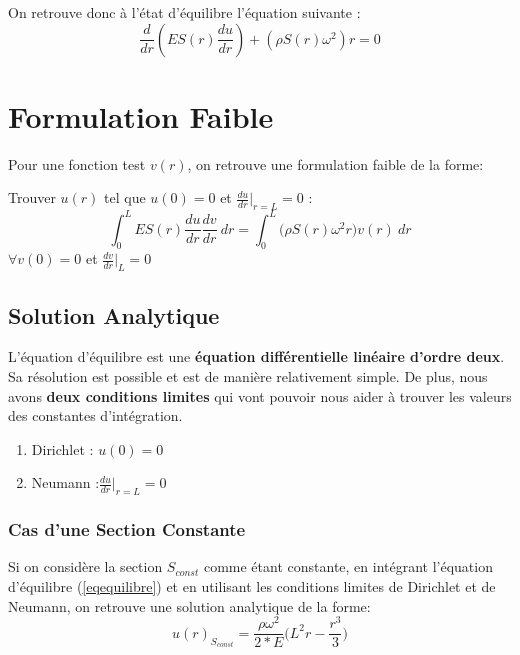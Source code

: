 \documentclass[a4paper,10pt]{report} %
\begin{document}
On retrouve donc à l'état d'équilibre l'équation suivante :
\begin{equation}
	\frac{d}{dr}(ES(r)\frac{du}{dr})+(\rho S(r)\omega^2)r =0
	\label{eqequilibre}
\end{equation}

\section{Formulation Faible}

Pour une fonction test $v(r)$, on retrouve une formulation faible de la forme:
\begin{center}
Trouver $u(r)$ tel que $u(0)=0$ et $\frac{du}{dr}\Big|_{r=L}=0$ :
	\begin{equation}
		\int_0^L \!ES(r)\frac{du}{dr}\frac{dv}{dr}~dr=\int_0^L \! \big(\rho S(r)\omega^2r\big)v(r)~dr
		\label{formulationfaible}
	\end{equation}
	$\forall v(0)=0$ et $\frac{dv}{dr}\big|_L=0$
\end{center}


\subsection{Solution Analytique}

L'équation d'équilibre est une \textbf{équation différentielle linéaire d'ordre deux}. Sa résolution est possible et est de manière relativement simple. De plus, nous avons \textbf{deux conditions limites} qui vont pouvoir nous aider à trouver les valeurs des constantes d'intégration.
\begin{enumerate}
	\item Dirichlet : $u(0)=0$
	\item Neumann :$\frac{du}{dr}\Big|_{r=L}=0$
\end{enumerate}

\subsubsection{Cas d'une Section Constante}

Si on considère la section $S_{const}$ comme étant constante, en intégrant l'équation d'équilibre (\ref{eqequilibre}) et en utilisant les conditions limites de Dirichlet et de Neumann, on retrouve une solution analytique de la forme:
\begin{equation}
	u(r)_{S_{const}}=\frac{\rho \omega^2}{2*E}\big(L^2 r-\frac{r^3}{3}\big)
	\label{solsconst}
\end{equation}
\end{document}
